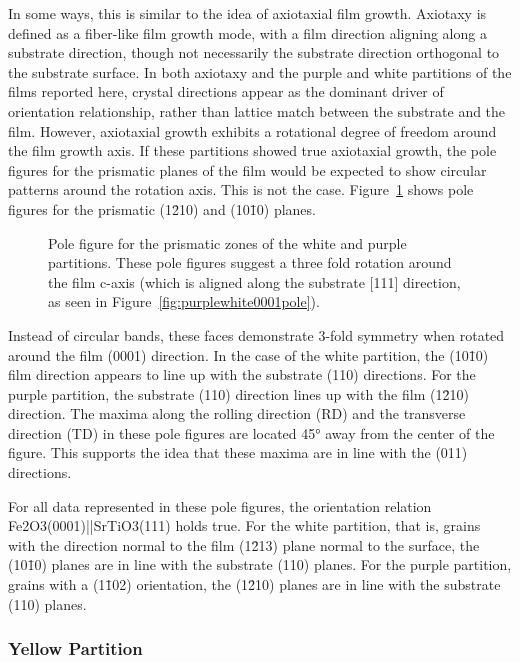 \documentclass[12pt,%
              twoside,
               letterpaper]{uiothesis}
\begin{document}
In some ways, this is similar to the idea of axiotaxial film growth. Axiotaxy is defined
as a fiber-like film growth mode, with a film direction aligning along a substrate
direction, though not necessarily the substrate direction orthogonal to the substrate
surface. In both axiotaxy and the purple and white partitions of the films reported here,
crystal directions appear as the dominant driver of orientation relationship, rather than
lattice match between the substrate and the film. However, axiotaxial growth exhibits a
rotational degree of freedom around the film growth axis.  If these partitions showed true
axiotaxial growth, the pole figures for the prismatic planes of the film would be expected
to show circular patterns around the rotation axis. This is not the case.
Figure~\ref{fig:purplewhiteprismatic} shows pole figures for the prismatic (1\={2}10) and
(10\={1}0) planes.
\begin{figure}
	\caption[Prismatic pole figures for white and purple grains]{%
		Pole figure for the prismatic zones of the white and purple partitions. 
		These pole figures suggest a three fold rotation around the film c-axis 
		(which is aligned along the substrate [111] direction, as seen in 
		Figure~\ref{fig:purplewhite0001pole}).}
	\label{fig:purplewhiteprismatic}
\end{figure}
Instead of circular bands, these faces demonstrate 3-fold symmetry when rotated around the
film (0001) direction. In the case of the white partition, the (10\={1}0) film direction
appears to line up with the substrate (110) directions. For the purple partition, the
substrate (110) direction lines up with the film (1\={2}10) direction. The maxima along
the rolling direction (RD) and the transverse direction (TD) in these pole figures are
located 45\si{\degree} away from the center of the figure. This supports the idea that
these maxima are in line with the (011) directions. 

For all data represented in these pole figures, the orientation relation
Fe2O3(0001)||SrTiO3(111) holds true. For the white partition, that is, grains
with the direction normal to the film (1\={2}13) plane normal to the surface, the
(10\={1}0) planes are in line with the substrate (110) planes. For the purple partition,
grains with a (1\={1}02) orientation, the (1\={2}10) planes are in line with the substrate
(110) planes. 


\subsubsection{Yellow Partition}
\label{subsubsec:single.growth.yellow}
\end{document}
